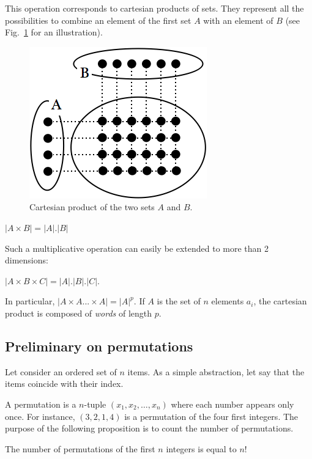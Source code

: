 \begin{itemize}
This operation corresponds to cartesian products of sets.
They represent all the possibilities to combine an element of the first set $A$ with an element of $B$
(see Fig.~\ref{fig:cartesianproduct} for an illustration). 
\begin{figure}[h]
\begin{center}
        \includegraphics[scale=0.4]{FiguresMaths/cartesianProduct}
        \caption{Cartesian product of the two sets $A$ and $B$.}
        \label{fig:cartesianproduct}
\end{center}
\end{figure}

$|A \times B| = |A|.|B|$

Such a multiplicative operation can easily be extended to more than 2 dimensions: 

$|A \times B \times C| = |A|.|B|.|C|$.

In particular, $|A \times A ... \times A| = |A|^p$.
If $A$ is the set of $n$ elements $a_i$,
the cartesian product is composed of \textit{words} of length $p$.
\end{itemize}


\subsection{Preliminary on permutations}

Let consider an ordered set of $n$ items. 
As a simple abstraction, let say that the items coincide with their index.

A permutation is a $n$-tuple $(x_1,x_2, \ldots , x_n)$ where each number appears only once. 
For instance, 
$(3,2,1,4)$ is a permutation of the four first integers. 
The purpose of the following proposition is to count the number of permutations.
\bigskip

\begin{prop}
The number of permutations of the first $n$ integers is equal to $n!$
\end{prop}

